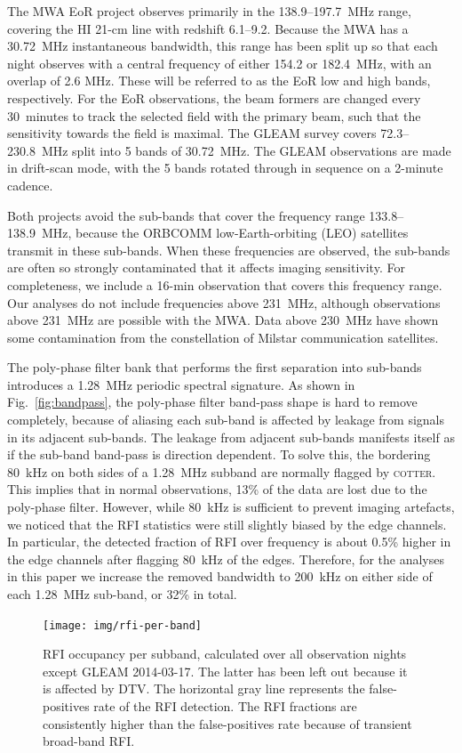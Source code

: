 \documentclass{pasa}
\begin{document}
The MWA EoR project observes primarily in the 138.9--197.7~MHz range, covering the HI 21-cm line with redshift 6.1--9.2. Because the MWA has a 30.72~MHz instantaneous bandwidth, this range has been split up so that each night observes with a central frequency of either 154.2 or 182.4~MHz, with an overlap of 2.6 MHz. These will be referred to as the EoR low and high bands, respectively. For the EoR observations, the beam formers are changed every 30~minutes to track the selected field with the primary beam, such that the sensitivity towards the field is maximal. The GLEAM survey covers 72.3--230.8~MHz split into 5 bands of 30.72~MHz. The GLEAM observations are made in drift-scan mode, with the 5 bands rotated through in sequence on a 2-minute cadence.

Both projects avoid the sub-bands that cover the frequency range 133.8--138.9~MHz, because the ORBCOMM low-Earth-orbiting (LEO) satellites transmit in these sub-bands. When these frequencies are observed, the sub-bands are often so strongly contaminated that it affects imaging sensitivity. For completeness, we include a 16-min observation that covers this frequency range. Our analyses do not include frequencies above 231~MHz, although observations above 231~MHz are possible with the MWA. Data above 230~MHz have shown some contamination from the constellation of Milstar communication satellites.

The poly-phase filter bank that performs the first separation into sub-bands introduces a 1.28~MHz periodic spectral signature. As shown in Fig.~\ref{fig:bandpass}, the poly-phase filter band-pass shape is hard to remove completely, because of aliasing each sub-band is affected by leakage from signals in its adjacent sub-bands. The leakage from adjacent sub-bands manifests itself as if the sub-band band-pass is direction dependent. To solve this, the bordering 80~kHz on both sides of a 1.28~MHz subband are normally flagged by \textsc{cotter}. This implies that in normal observations, 13\% of the data are lost due to the poly-phase filter. However, while 80~kHz is sufficient to prevent imaging artefacts, we noticed that the RFI statistics were still slightly biased by the edge channels. In particular, the detected fraction of RFI over frequency is about 0.5\% higher in the edge channels after flagging 80~kHz of the edges. Therefore, for the analyses in this paper we increase the removed bandwidth to 200~kHz on either side of each 1.28~MHz sub-band, or 32\% in total.
\noindent\begin{figure}
\begin{center}\hspace*{-0.2cm}\texttt{[image: img/rfi-per-band]}
\caption{RFI occupancy per subband, calculated over all observation nights except GLEAM 2014-03-17. The latter has been left out because it is affected by DTV. The horizontal gray line represents the false-positives rate of the RFI detection. The RFI fractions are consistently higher than the false-positives rate because of transient broad-band RFI.}
\label{fig:rfi-per-band}
\end{center}
\end{figure}
\end{document}
